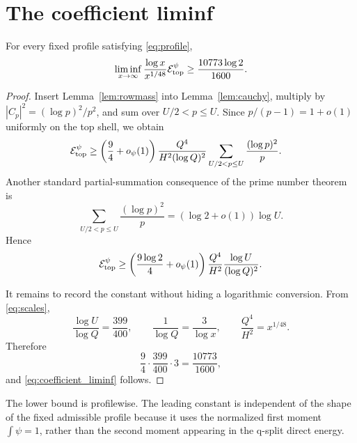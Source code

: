 \section{The coefficient liminf}\label{sec:coefficient}

\begin{theorem}\label{thm:coefficient}
For every fixed profile satisfying \eqref{eq:profile},
\begin{equation}\label{eq:coefficient_liminf}
 \liminf_{x\to\infty}\frac{\log x}{x^{1/48}}\mathcal{E}_{\mathrm{top}}^{\psi}
 \geq \frac{10773\log 2}{1600}.
\end{equation}
\end{theorem}

\begin{proof}
Insert Lemma~\ref{lem:rowmass} into Lemma~\ref{lem:cauchy}, multiply by
$|C_p|^2=(\log p)^2/p^2$, and sum over $U/2<p\leq U$.  Since
$p/(p-1)=1+o(1)$ uniformly on the top shell, we obtain
\begin{align}
 \mathcal{E}_{\mathrm{top}}^{\psi}
 &\geq \left(\frac94+o_\psi(1)\right)
 \frac{Q^4}{H^2(\log Q)^2}
 \sum_{U/2<p\leq U}\frac{(\log p)^2}{p}.\label{eq:pre_pnt}
\end{align}
Another standard partial-summation consequence of the prime number theorem is
\begin{equation}\label{eq:weighted_pnt}
 \sum_{U/2<p\leq U}\frac{(\log p)^2}{p}
 =(\log2+o(1))\log U.
\end{equation}
Hence
\begin{equation}\label{eq:coefficient_preconstant}
 \mathcal{E}_{\mathrm{top}}^{\psi}\geq
 \left(\frac{9\log2}{4}+o_\psi(1)\right)
 \frac{Q^4}{H^2}\frac{\log U}{(\log Q)^2}.
\end{equation}

It remains to record the constant without hiding a logarithmic conversion.
From \eqref{eq:scales},
\[
 \frac{\log U}{\log Q}=\frac{399}{400},
 \qquad \frac{1}{\log Q}=\frac{3}{\log x},
 \qquad \frac{Q^4}{H^2}=x^{1/48}.
\]
Therefore
\[
 \frac94\cdot\frac{399}{400}\cdot3
 =\frac{10773}{1600},
\]
and \eqref{eq:coefficient_liminf} follows.
\end{proof}

\begin{remark}
The lower bound is profilewise.  The leading constant is independent of the
shape of the fixed admissible profile because it uses the normalized first
moment $\int\psi=1$, rather than the second moment appearing in the q-split
direct energy.
\end{remark}
